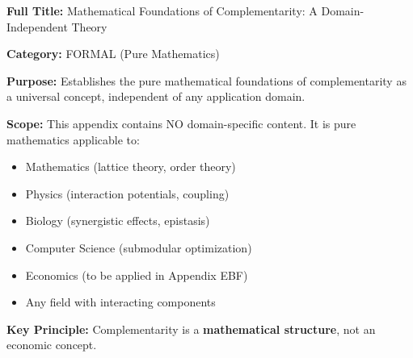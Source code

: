 \begin{tcolorbox}[colback=blue!5!white,colframe=blue!75!black,title=\textbf{Appendix FND: FORMAL-FOUND}]
\textbf{Full Title:} Mathematical Foundations of Complementarity: A Domain-Independent Theory

\textbf{Category:} FORMAL (Pure Mathematics)

\textbf{Purpose:} Establishes the pure mathematical foundations of complementarity as a universal concept, independent of any application domain.

\textbf{Scope:} This appendix contains NO domain-specific content. It is pure mathematics applicable to:
\begin{itemize}[noitemsep]
    \item Mathematics (lattice theory, order theory)
    \item Physics (interaction potentials, coupling)
    \item Biology (synergistic effects, epistasis)
    \item Computer Science (submodular optimization)
    \item Economics (to be applied in Appendix EBF)
    \item Any field with interacting components
\end{itemize}

\textbf{Key Principle:} Complementarity is a \textbf{mathematical structure}, not an economic concept.
\end{tcolorbox}

